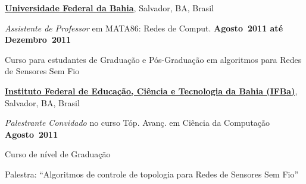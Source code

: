 \documentclass[10pt]{article}
\newcommand{\halfblankline}{\quad\vspace{-0.5\baselineskip}\pagebreak[3]}
\begin{document}
\href{http://www.ufba.br/}{\textbf{Universidade Federal da Bahia}},
Salvador, BA, Brasil
\begin{outerlist}

\item[] \textit{Assistente de Professor} em MATA86: Redes de Comput.
    \hfill \textbf{Agosto~2011 até Dezembro~2011}
    \begin{innerlist}
    \item Curso para estudantes de Graduação e Pós-Graduação em algoritmos
      para Redes de Sensores Sem Fio
    \end{innerlist}

\end{outerlist}

\halfblankline

\href{http://ifba.edu.br/}{\textbf{Instituto Federal de Educação, Ciência e Tecnologia da Bahia (IFBa)}},
Salvador, BA, Brasil
\begin{outerlist}

\item[] \textit{Palestrante Convidado} no curso Tóp. Avanç. em Ciência da Computação
    \hfill \textbf{Agosto~2011}
    \begin{innerlist}
        \item Curso de nível de Graduação
        \item Palestra: ``Algoritmos de controle de topologia para Redes de Sensores Sem Fio''
    \end{innerlist}
\end{outerlist}
\end{document}

